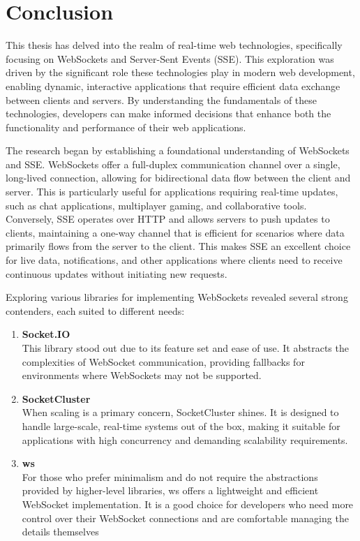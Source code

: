 \newpage

\section{Conclusion}

This thesis has delved into the realm of real-time web technologies, specifically focusing on WebSockets and Server-Sent Events (SSE). This exploration was driven by the significant role these technologies play in modern web development, enabling dynamic, interactive applications that require efficient data exchange between clients and servers. By understanding the fundamentals of these technologies, developers can make informed decisions that enhance both the functionality and performance of their web applications.

The research began by establishing a foundational understanding of WebSockets and SSE. WebSockets offer a full-duplex communication channel over a single, long-lived connection, allowing for bidirectional data flow between the client and server. This is particularly useful for applications requiring real-time updates, such as chat applications, multiplayer gaming, and collaborative tools. Conversely, SSE operates over HTTP and allows servers to push updates to clients, maintaining a one-way channel that is efficient for scenarios where data primarily flows from the server to the client. This makes SSE an excellent choice for live data, notifications, and other applications where clients need to receive continuous updates without initiating new requests.

Exploring various libraries for implementing WebSockets revealed several strong contenders, each suited to different needs:

\begin{enumerate}
    \item \textbf{Socket.IO} \\ This library stood out due to its feature set and ease of use. It abstracts the complexities of WebSocket communication, providing fallbacks for environments where WebSockets may not be supported.
    \item \textbf{SocketCluster} \\ When scaling is a primary concern, SocketCluster shines. It is designed to handle large-scale, real-time systems out of the box, making it suitable for applications with high concurrency and demanding scalability requirements.
    \item \textbf{ws} \\ For those who prefer minimalism and do not require the abstractions provided by higher-level libraries, ws offers a lightweight and efficient WebSocket implementation. It is a good choice for developers who need more control over their WebSocket connections and are comfortable managing the details themselves
\end{enumerate}

